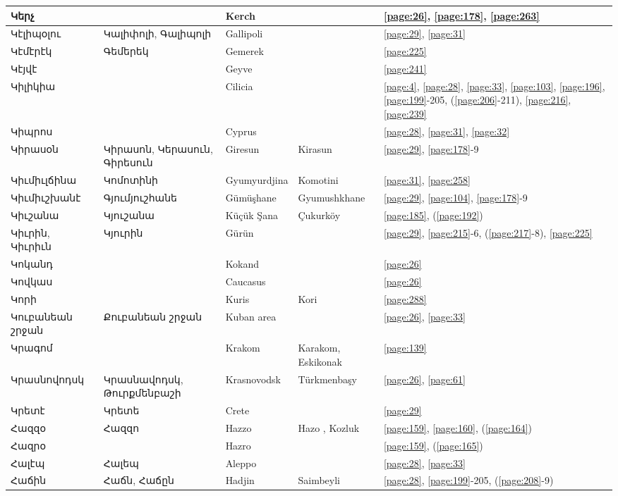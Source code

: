 \begin{center}
\begin{longtable}{|p{}|p{3cm}|p{3cm}|p{2cm}|p{3cm}|}
Կերչ& & Kerch& &\ref{page:26}, \ref{page:178}, \ref{page:263}\\ \hline
Կէլիպօլու&Կալիփոլի, Գալիպոլի & Gallipoli& &\ref{page:29}, \ref{page:31}\\ \hline
Կէմէրէկ& Գեմերեկ&  Gemerek & &\ref{page:225}\\ \hline
Կէյվէ& &Geyve & &\ref{page:241}\\ \hline
Կիլիկիա& &Cilicia & &\ref{page:4}, \ref{page:28}, \ref{page:33}, \ref{page:103}, \ref{page:196}, \ref{page:199}-205, (\ref{page:206}-211), \ref{page:216}, \ref{page:239}\\ \hline
Կիպրոս& & Cyprus& &\ref{page:28}, \ref{page:31}, \ref{page:32}\\ \hline
Կիրասօն&Կիրասոն, Կերասուն, Գիրեսուն&Giresun &Kirasun &\ref{page:29}, \ref{page:178}-9\\ \hline
Կիւմիւլճինա& Կոմոտինի&Gyumyurdjina & Komotini&\ref{page:31}, \ref{page:258}\\ \hline
Կիւմիւշխանէ&Գյումյուշհանե &Gümüşhane &  Gyumushkhane&\ref{page:29}, \ref{page:104}, \ref{page:178}-9\\ \hline
Կիւշանա&Կյուշանա &Küçük Şana &Çukurköy  &\ref{page:185}, (\ref{page:192})\\ \hline
Կիւրին, Կիւրիւն &Կյուրին & Gürün& &\ref{page:29}, \ref{page:215}-6, (\ref{page:217}-8), \ref{page:225}\\ \hline
Կոկանդ& & Kokand& &\ref{page:26}\\ \hline
Կովկաս& & Caucasus& &\ref{page:26}\\ \hline
Կորի& & Kuris &Kori &\ref{page:288}\\ \hline
Կուբանեան շրջան& Քուբանեան շրջան&Kuban area & &\ref{page:26}, \ref{page:33}\\ \hline
Կրագոմ& &Krakom &Karakom, Eskikonak &\ref{page:139}\\ \hline
Կրասնովոդսկ&Կրասնավոդսկ, Թուրքմենբաշի & Krasnovodsk&Türkmenbaşy &\ref{page:26}, \ref{page:61}\\ \hline
Կրետէ&Կրետե & Crete& &\ref{page:29}\\ \hline
Հազզօ& Հազզո& Hazzo&Hazo , Kozluk&\ref{page:159}, \ref{page:160}, (\ref{page:164})\\ \hline
Հազրօ& &Hazro & &\ref{page:159}, (\ref{page:165})\\ \hline
Հալէպ& Հալեպ&Aleppo & &\ref{page:28}, \ref{page:33}\\ \hline
Հաճին&  Հաճն, Հաճըն&Hadjin &Saimbeyli& \ref{page:28}, \ref{page:199}-205, (\ref{page:208}-9)\\ \hline

\end{longtable}
\end{center}
